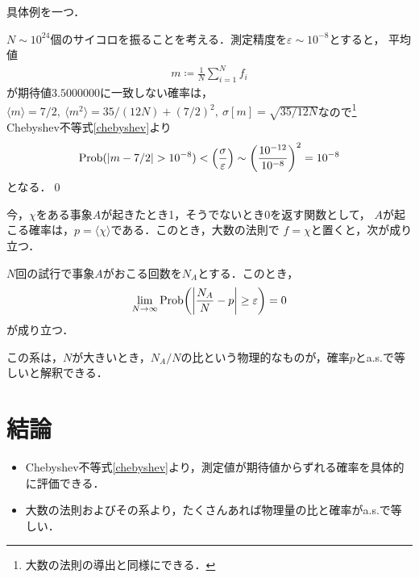   具体例を一つ．
  \begin{eg}
    $N\sim10^{24}$個のサイコロを振ることを考える．測定精度を$\varepsilon\sim10^{-8}$とすると，
    平均値
    \begin{align}
      m\coloneqq \frac{1}{N}\sum_{i=1}^{N}f_i
    \end{align}
    が期待値$3.5000000$に一致しない確率は，$\langle m \rangle = 7/2,\ \langle m^2 \rangle = 35 / (12 N) + (7/2)^2,\ \sigma[m] = \sqrt{35/12N}$なので\footnote{大数の法則の導出と同様にできる．}
    Chebyshev不等式\eqref{chebyshev}より
    \begin{align}
      \mathrm{Prob}(\abs{m-7/2} > 10^{-8}) < \qty(\frac{\sigma}{\varepsilon})\sim \qty(\frac{10^{-12}}{10^{-8}})^{2}= 10^{-8}
    \end{align}
    となる．\qed
  \end{eg}
  今，$\chi$をある事象$A$が起きたとき1，そうでないとき0を返す関数として，
  $A$が起こる確率は，$p = \langle \chi \rangle$である．このとき，大数の法則で
  $f=\chi$と置くと，次が成り立つ．
  \begin{cor}
    $N$回の試行で事象$A$がおこる回数を$N_A$とする．このとき，
    \begin{align}
      \lim_{N\to\infty}\mathrm{Prob}\qty(\abs{\frac{N_A}{N}-p}\geq \varepsilon ) = 0  
    \end{align}
    が成り立つ．
  \end{cor}
  この系は，$N$が大きいとき，$N_A/N$の比という物理的なものが，確率$p$とa.s.で等しいと解釈できる．
\section{結論}
  \begin{itemize}
    \item Chebyshev不等式\eqref{chebyshev}より，測定値が期待値からずれる確率を具体的に評価できる．
    \item 大数の法則およびその系より，たくさんあれば物理量の比と確率がa.s.で等しい．
  \end{itemize}
